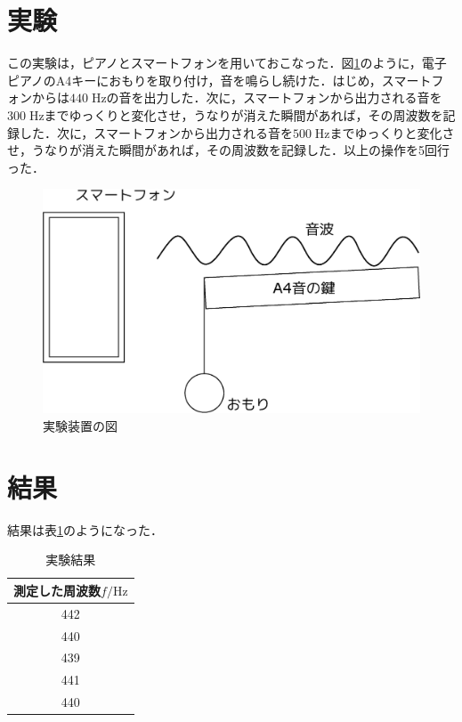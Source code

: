 \documentclass[a4paper, 9pt]{jsarticle}
\newcommand{\ut}[1]{\;\mbox{$\mathrm{#1}$}}
\begin{document}
\section{実験}
この実験は，ピアノとスマートフォンを用いておこなった．図\ref{fig1}のように，電子ピアノのA4キーにおもりを取り付け，音を鳴らし続けた．はじめ，スマートフォンからは$440\ut{Hz}$の音を出力した．次に，スマートフォンから出力される音を$300\ut{Hz}$までゆっくりと変化させ，うなりが消えた瞬間があれば，その周波数を記録した．次に，スマートフォンから出力される音を$500\ut{Hz}$までゆっくりと変化させ，うなりが消えた瞬間があれば，その周波数を記録した．以上の操作を5回行った．
\begin{figure}[H]
  \centering
  \includegraphics[scale=0.2]{fig.eps}
  \caption{実験装置の図}
  \label{fig1}
\end{figure}

\section{結果}
結果は表\ref{tab1}のようになった．
\begin{table}[H]
  \centering
  \caption{実験結果}
  \begin{tabular}{c}
    \hline
    測定した周波数$f/\mathrm{Hz}$ \\
    \hline
    442                           \\
    440                           \\
    439                           \\
    441                           \\
    440                           \\
    \hline
  \end{tabular}
  \label{tab1}
\end{table}
\end{document}
